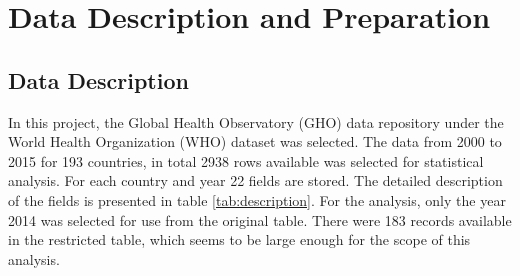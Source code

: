 \section{Data Description and Preparation}
\label{sec:data-preparation}

\subsection{Data Description}
\label{sec:data-description}

In this project, the Global Health Observatory (GHO) data repository under the World Health Organization (WHO) dataset \cite{WHO} was selected.  The data from 2000 to 2015 for 193 countries, in total 2938 rows available was selected for statistical analysis. For each country and year 22 fields are stored. The detailed description of the fields is presented in table \ref{tab:description}. For the analysis, only the year 2014 was selected for use from the original table. There were 183 records available in the restricted table, which seems to be large enough for the scope of this analysis.

